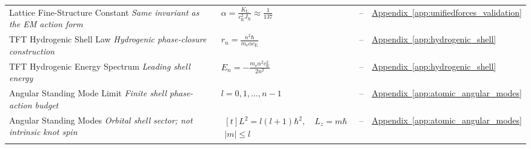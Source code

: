 \begin{longtable}{@{} p{4.5cm} p{6cm} c p{4cm} @{}}
{\raggedright Lattice Fine-Structure Constant \newline \textit{Same invariant as the EM action form}\par} & {\raggedright $\alpha = \frac{K_{\mathrm{L}}}{c_{\mathrm{E}}^2 J_{\mathrm{N}}} \approx \frac{1}{137}$\par} & -- & {\raggedright \hyperref[app:unifiedforces_validation]{Appendix~\ref*{app:unifiedforces_validation}}\par} \\

{\raggedright TFT Hydrogenic Shell Law \newline \textit{Hydrogenic phase-closure construction}\par} & {\raggedright $r_n = \frac{n^2 \hbar}{m_{\mathrm{e}} \alpha c_{\mathrm{E}}}$\par} & -- & {\raggedright \hyperref[app:hydrogenic_shell]{Appendix~\ref*{app:hydrogenic_shell}}\par} \\

{\raggedright TFT Hydrogenic Energy Spectrum \newline \textit{Leading shell energy}\par} & {\raggedright $E_n = -\frac{m_{\mathrm{e}} \alpha^2 c_{\mathrm{E}}^2}{2n^2}$\par} & -- & {\raggedright \hyperref[app:hydrogenic_shell]{Appendix~\ref*{app:hydrogenic_shell}}\par} \\

{\raggedright Angular Standing Mode Limit \newline \textit{Finite shell phase-action budget}\par} & {\raggedright $l=0,1,\ldots,n-1$\par} & -- & {\raggedright \hyperref[app:atomic_angular_modes]{Appendix~\ref*{app:atomic_angular_modes}}\par} \\

{\raggedright Angular Standing Modes \newline \textit{Orbital shell sector; not intrinsic knot spin}\par} & {\raggedright $\begin{gathered}[t]L^2=l(l+1)\hbar^2,\quad L_z=m\hbar \\ |m|\leq l\end{gathered}$\par} & -- & {\raggedright \hyperref[app:atomic_angular_modes]{Appendix~\ref*{app:atomic_angular_modes}}\par} \\


\end{longtable}
